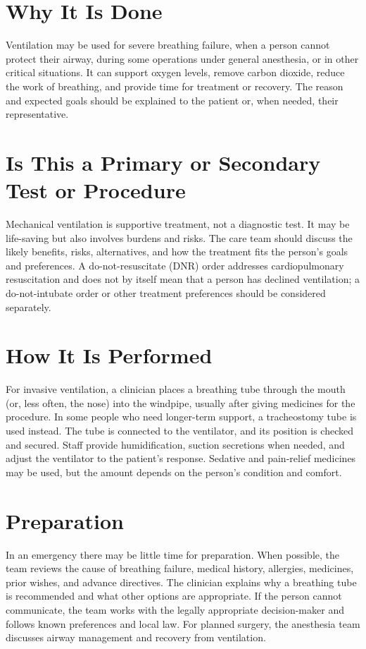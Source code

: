 \section*{Why It Is Done}
Ventilation may be used for severe breathing failure, when a person cannot protect their airway, during some operations under general anesthesia, or in other critical situations. It can support oxygen levels, remove carbon dioxide, reduce the work of breathing, and provide time for treatment or recovery. The reason and expected goals should be explained to the patient or, when needed, their representative.

\section*{Is This a Primary or Secondary Test or Procedure}
Mechanical ventilation is supportive treatment, not a diagnostic test. It may be life-saving but also involves burdens and risks. The care team should discuss the likely benefits, risks, alternatives, and how the treatment fits the person's goals and preferences. A do-not-resuscitate (DNR) order addresses cardiopulmonary resuscitation and does not by itself mean that a person has declined ventilation; a do-not-intubate order or other treatment preferences should be considered separately.

\section*{How It Is Performed}
For invasive ventilation, a clinician places a breathing tube through the mouth (or, less often, the nose) into the windpipe, usually after giving medicines for the procedure. In some people who need longer-term support, a tracheostomy tube is used instead. The tube is connected to the ventilator, and its position is checked and secured. Staff provide humidification, suction secretions when needed, and adjust the ventilator to the patient's response. Sedative and pain-relief medicines may be used, but the amount depends on the person's condition and comfort.

\section*{Preparation}
In an emergency there may be little time for preparation. When possible, the team reviews the cause of breathing failure, medical history, allergies, medicines, prior wishes, and advance directives. The clinician explains why a breathing tube is recommended and what other options are appropriate. If the person cannot communicate, the team works with the legally appropriate decision-maker and follows known preferences and local law. For planned surgery, the anesthesia team discusses airway management and recovery from ventilation.

